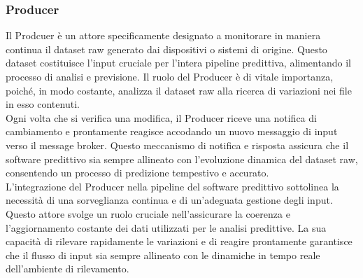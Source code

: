 \subsubsection[Producer]{Producer} 
Il Prodcuer è un attore specificamente designato a monitorare in maniera continua il dataset raw generato dai dispositivi o sistemi di origine.
Questo dataset costituisce l'input cruciale per l'intera pipeline predittiva, alimentando il processo di analisi e previsione.
Il ruolo del Producer è di vitale importanza, poiché, in modo costante, analizza il dataset raw alla ricerca di variazioni nei file in esso contenuti. \\
Ogni volta che si verifica una modifica, il Producer riceve una notifica di cambiamento e prontamente reagisce accodando un nuovo messaggio di input verso il message broker.
Questo meccanismo di notifica e risposta assicura che il software predittivo sia sempre allineato con l'evoluzione dinamica del dataset raw, consentendo un processo di predizione tempestivo e accurato. \\
L'integrazione del Producer nella pipeline del software predittivo sottolinea la necessità di una sorveglianza continua e di un'adeguata gestione degli input.
Questo attore svolge un ruolo cruciale nell'assicurare la coerenza e l'aggiornamento costante dei dati utilizzati per le analisi predittive.
La sua capacità di rilevare rapidamente le variazioni e di reagire prontamente garantisce che il flusso di input sia sempre allineato con le dinamiche in tempo reale dell'ambiente di rilevamento.

